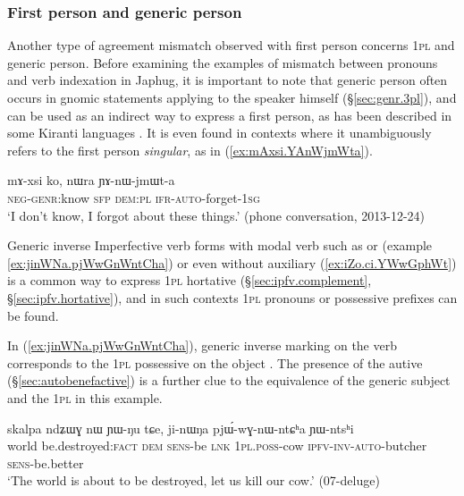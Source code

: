 \subsubsection{First person and generic person} \label{sec:1.genr}
 
Another type of agreement mismatch observed with first person concerns \textsc{1pl} and generic person. Before examining the examples of mismatch between pronouns and verb indexation in Japhug, it is important to note that generic person often occurs in gnomic statements applying to the speaker himself (§\ref{sec:genr.3pl}), and can be used as an indirect way to express a first person, as has been described in some Kiranti languages \citep{bickel15antipassive}. It is even found in contexts where it unambiguously refers to the first person \textit{singular}, as in (\ref{ex:mAxsi.YAnWjmWta}).

\begin{exe}
\ex   \label{ex:mAxsi.YAnWjmWta}
 \gll mɤ-xsi ko, nɯra ɲɤ-nɯ-jmɯt-a \\
\textsc{neg}-\textsc{genr}:know \textsc{sfp} \textsc{dem}:\textsc{pl} \textsc{ifr}-\textsc{auto}-forget-\textsc{1sg} \\
\glt `I don't know, I forgot about these things.' (phone conversation, 2013-12-24)
\end{exe}

Generic inverse Imperfective verb forms with modal verb such as  or  (example \ref{ex:jinWNa.pjWwGnWntCha}) or even without auxiliary (\ref{ex:iZo.ci.YWwGphWt}) is a common way to express \textsc{1pl} hortative (§\ref{sec:ipfv.complement}, §\ref{sec:ipfv.hortative}), and in such contexts \textsc{1pl} pronouns or possessive prefixes can be found.

In (\ref{ex:jinWNa.pjWwGnWntCha}), generic inverse marking on the verb corresponds to the \textsc{1pl} possessive on the object . The presence of the autive  (§\ref{sec:autobenefactive}) is a further clue to the equivalence of the generic subject and the \textsc{1pl} in this example.

\begin{exe}
\ex   \label{ex:jinWNa.pjWwGnWntCha}
 \gll skalpa ndʑɯɣ nɯ ɲɯ-ŋu tɕe, ji-nɯŋa pjɯ́-wɣ-nɯ-ntɕʰa ɲɯ-ntsʰi \\
world be.destroyed:\textsc{fact} \textsc{dem} \textsc{sens}-be \textsc{lnk} \textsc{1pl}.\textsc{poss}-cow \textsc{ipfv}-\textsc{inv}-\textsc{auto}-butcher \textsc{sens}-be.better \\
\glt `The world is about to be destroyed, let us kill our cow.' (07-deluge) 	
\end{exe}

